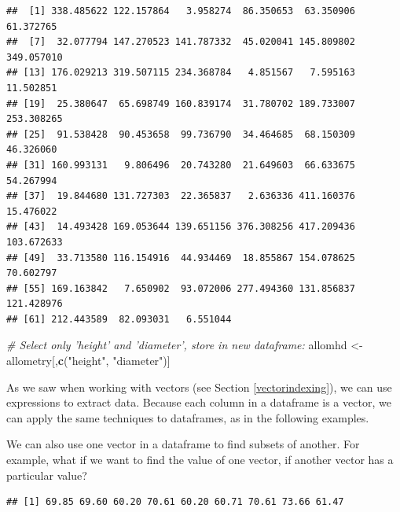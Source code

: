 \documentclass[]{book}
\newenvironment{Shaded}{\begin{snugshade}}{\end{snugshade}}
\newcommand{\CommentTok}[1]{\textcolor[rgb]{0.56,0.35,0.01}{\textit{#1}}}
\newcommand{\DecValTok}[1]{\textcolor[rgb]{0.00,0.00,0.81}{#1}}
\newcommand{\KeywordTok}[1]{\textcolor[rgb]{0.13,0.29,0.53}{\textbf{#1}}}
\newcommand{\NormalTok}[1]{#1}
\newcommand{\OperatorTok}[1]{\textcolor[rgb]{0.81,0.36,0.00}{\textbf{#1}}}
\newcommand{\StringTok}[1]{\textcolor[rgb]{0.31,0.60,0.02}{#1}}
\begin{document}
\begin{verbatim}
##  [1] 338.485622 122.157864   3.958274  86.350653  63.350906  61.372765
##  [7]  32.077794 147.270523 141.787332  45.020041 145.809802 349.057010
## [13] 176.029213 319.507115 234.368784   4.851567   7.595163  11.502851
## [19]  25.380647  65.698749 160.839174  31.780702 189.733007 253.308265
## [25]  91.538428  90.453658  99.736790  34.464685  68.150309  46.326060
## [31] 160.993131   9.806496  20.743280  21.649603  66.633675  54.267994
## [37]  19.844680 131.727303  22.365837   2.636336 411.160376  15.476022
## [43]  14.493428 169.053644 139.651156 376.308256 417.209436 103.672633
## [49]  33.713580 116.154916  44.934469  18.855867 154.078625  70.602797
## [55] 169.163842   7.650902  93.072006 277.494360 131.856837 121.428976
## [61] 212.443589  82.093031   6.551044
\end{verbatim}

\begin{Shaded}
\begin{Highlighting}[]
\CommentTok{# Select only 'height' and 'diameter', store in new dataframe:}
\NormalTok{allomhd <-}\StringTok{ }\NormalTok{allometry[,}\KeywordTok{c}\NormalTok{(}\StringTok{"height"}\NormalTok{, }\StringTok{"diameter"}\NormalTok{)]}
\end{Highlighting}
\end{Shaded}

As we saw when working with vectors (see Section \ref{vectorindexing}), we can use expressions to extract data. Because each column in a dataframe is a vector, we can apply the same techniques to dataframes, as in the following examples.

We can also use one vector in a dataframe to find subsets of another. For example, what if we want to find the value of one vector, if another vector has a particular value?

\begin{Shaded}
\end{Shaded}

\begin{verbatim}
## [1] 69.85 69.60 60.20 70.61 60.20 60.71 70.61 73.66 61.47
\end{verbatim}
\end{document}
